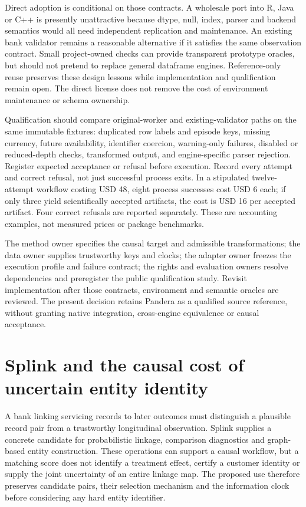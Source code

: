 Direct adoption is conditional on those contracts. A wholesale port into R,
Java or C++ is presently unattractive because dtype, null, index, parser and
backend semantics would all need independent replication and maintenance.
An existing bank validator remains a reasonable alternative if it satisfies the
same observation contract. Small project-owned checks can provide transparent
prototype oracles, but should not pretend to replace general dataframe engines.
Reference-only reuse preserves these design lessons while implementation and
qualification remain open. The direct license does not remove the cost of
environment maintenance or schema ownership.~\citep{exec24_pandera_source}

Qualification should compare original-worker and existing-validator paths on
the same immutable fixtures: duplicated row labels and episode keys, missing
currency, future availability, identifier coercion, warning-only failures,
disabled or reduced-depth checks, transformed output, and engine-specific
parser rejection. Register expected acceptance or refusal before execution.
Record every attempt and correct refusal, not just successful process exits.
In a stipulated twelve-attempt workflow costing USD 48, eight process successes
cost USD 6 each; if only three yield scientifically accepted artifacts, the cost
is USD 16 per accepted artifact. Four correct refusals are reported separately.
These are accounting examples, not measured prices or package benchmarks.
\citep{exec24_pandera_reference}

The method owner specifies the causal target and admissible transformations;
the data owner supplies trustworthy keys and clocks; the adapter owner freezes
the execution profile and failure contract; the rights and evaluation owners
resolve dependencies and preregister the public qualification study. Revisit
implementation after those contracts, environment and semantic oracles are
reviewed. The present decision retains Pandera as a qualified source reference,
without granting native integration, cross-engine equivalence or causal acceptance.


\section{Splink and the causal cost of uncertain entity identity}
\label{sec:exec24-splink}
A bank linking servicing records to later outcomes must distinguish a plausible record pair from a trustworthy longitudinal observation. Splink supplies a concrete candidate for probabilistic linkage, comparison diagnostics and graph-based entity construction. These operations can support a causal workflow, but a matching score does not identify a treatment effect, certify a customer identity or supply the joint uncertainty of an entire linkage map. The proposed use therefore preserves candidate pairs, their selection mechanism and the information clock before considering any hard entity identifier.~\citep{exec24_splink_sources,exec24_splink_contract}

